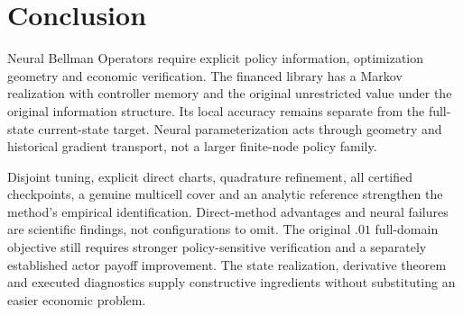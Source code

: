 \section{Conclusion}\label{sec:r24conclusion}
Neural Bellman Operators require explicit policy information, optimization geometry and economic verification. The financed library has a Markov realization with controller memory and the original unrestricted value under the original information structure. Its local accuracy remains separate from the full-state current-state target. Neural parameterization acts through geometry and historical gradient transport, not a larger finite-node policy family.

Disjoint tuning, explicit direct charts, quadrature refinement, all certified checkpoints, a genuine multicell cover and an analytic reference strengthen the method's empirical identification. Direct-method advantages and neural failures are scientific findings, not configurations to omit. The original $.01$ full-domain objective still requires stronger policy-sensitive verification and a separately established actor payoff improvement. The state realization, derivative theorem and executed diagnostics supply constructive ingredients without substituting an easier economic problem.

